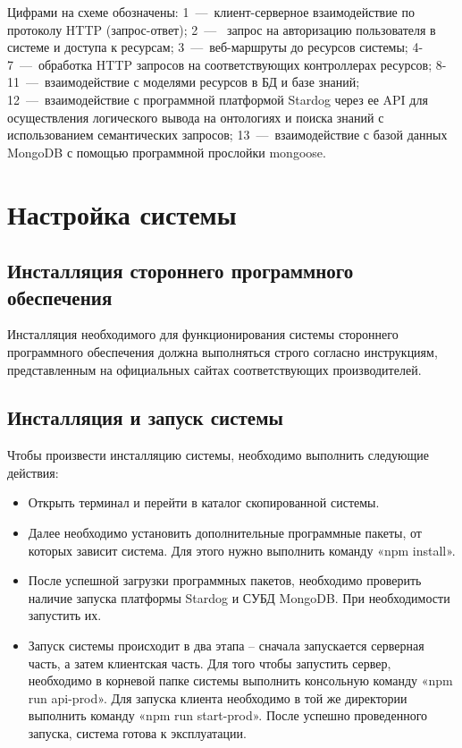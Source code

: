 \documentclass[a4paper]{G2-105}
\begin{document}
Цифрами на схеме обозначены: 1~---~клиент-серверное взаимодействие по протоколу HTTP (запрос-ответ); 2~---~ запрос на авторизацию пользователя в системе и доступа к ресурсам; 3~---~веб-маршруты до ресурсов системы; 4-7~---~обработка HTTP запросов на соответствующих контроллерах ресурсов; 8-11~---~взаимодействие с моделями ресурсов в БД и базе знаний; 12~---~взаимодействие с программной платформой Stardog через ее API для осуществления логического вывода на онтологиях и поиска знаний с использованием семантических запросов; 13~---~взаимодействие с базой данных MongoDB с помощью программной прослойки mongoose.

\chapter{Настройка системы}

\ttl

\section{Инсталляция стороннего программного обеспечения}

Инсталляция необходимого для функционирования системы стороннего программного обеспечения должна выполняться строго согласно инструкциям, представленным на официальных сайтах соответствующих производителей.

\section{Инсталляция и запуск системы}

Чтобы произвести инсталляцию системы, необходимо выполнить следующие действия:
\begin{itemize}
\item Открыть терминал и перейти в каталог скопированной системы.
\item Далее необходимо установить дополнительные программные пакеты, от которых зависит система. Для этого нужно выполнить команду «npm install».
\item После успешной загрузки программных пакетов, необходимо проверить наличие запуска платформы Stardog и СУБД MongoDB. При необходимости запустить их.
\item Запуск системы происходит в два этапа -- сначала запускается серверная часть, а затем клиентская часть. Для того чтобы запустить сервер, необходимо в корневой папке системы выполнить консольную команду «npm run api-prod». Для запуска клиента необходимо в той же директории выполнить команду «npm run start-prod». После успешно проведенного запуска, система готова к эксплуатации.
\end{itemize}
\end{document}
